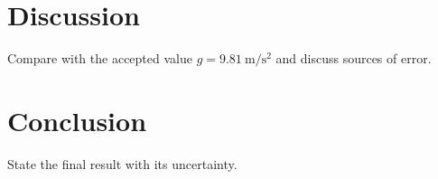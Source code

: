 \documentclass[11pt, a4paper]{article}
\begin{document}
\section{Discussion}
Compare with the accepted value $g = \qty{9.81}{\metre\per\second\squared}$ and
discuss sources of error.

\section{Conclusion}
State the final result with its uncertainty.
\end{document}
